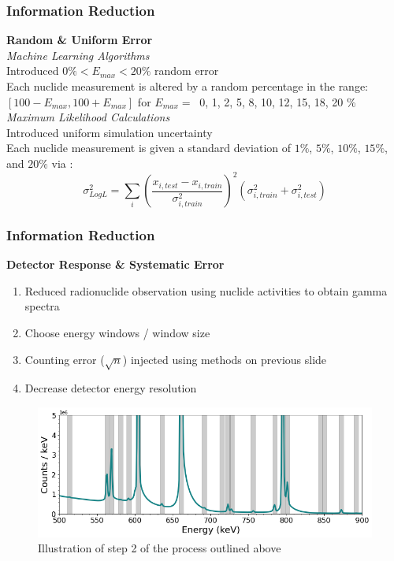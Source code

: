 \begin{frame}
  \frametitle{Information Reduction}
  \textbf{\large Random \& Uniform Error} \\
  \bigskip
  \textit{Machine Learning Algorithms} \\ \medskip
  Introduced $0\% < E_{max} < 20\%$ random error\\ \smallskip
  Each nuclide measurement is altered by a random percentage in the range: 
  $[100-E_{max},100+E_{max}]$ for $E_{max} = \:$ 
  0, 1, 2, 5, 8, 10, 12, 15, 18, 20 \% \\
  \bigskip
  \textit{Maximum Likelihood Calculations} \\ \medskip
  Introduced uniform simulation uncertainty\\ \smallskip
  Each nuclide measurement is given a standard deviation of $1\%$, $5\%$, 
  $10\%$, $15\%$, and $20\%$ via \cite{mll_sensitivity}:
  \[
    \sigma_{Log L}^2 = \sum_i \left( 
                              \frac{x_{i,test} - x_{i,train}}{\sigma_{i,train}^2}
                              \right)^2 
                              (\sigma_{i,train}^2 + \sigma_{i,test}^2)
  \]
\end{frame}

\begin{frame}
  \frametitle{Information Reduction}
  \textbf{\large Detector Response \& Systematic Error} \\
  \medskip
  \begin{enumerate}
    \item Reduced radionuclide observation using nuclide activities to obtain gamma spectra
    \item Choose energy windows / window size
    \item Counting error ($\sqrt{n}$) injected using methods on previous slide
    \item Decrease detector energy resolution
  \end{enumerate}
  \begin{figure}[h!]
    \centering
    \includegraphics[height=0.4\textheight]{./figures/energy_window_example.png}
    \caption{Illustration of step 2 of the process outlined above}
  \end{figure}
\end{frame}
